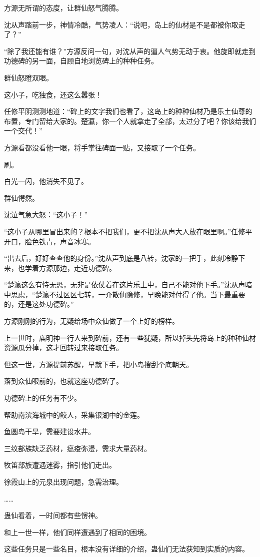 \begin{this_body}
方源无所谓的态度，让群仙怒气腾腾。

沈从声踏前一步，神情冷酷，气势凌人：“说吧，岛上的仙材是不是都被你取走了？”

“除了我还能有谁？”方源反问一句，对沈从声的逼人气势无动于衷。他旋即就走到功德碑的另一面，自顾自地浏览碑上的种种任务。

群仙怒瞪双眼。

这小子，吃独食，还这么嚣张！

任修平阴测测地道：“碑上的文字我们也看了，这岛上的种种仙材乃是乐土仙尊的布置，专门留给大家的。楚瀛，你一个人就拿走了全部，太过分了吧？你该给我们一个交代！”

方源看都没看他一眼，将手掌往碑面一贴，又接取了一个任务。

刷。

白光一闪，他消失不见了。

群仙愕然。

沈泣气急大怒：“这小子！”

“这小子从哪里冒出来的？根本不把我们，更不把沈从声大人放在眼里啊。”任修平开口，脸色铁青，声音冰寒。

“出去后，好好查查他的身份。”沈从声到底是八转，沈家的一把手，此刻冷静下来，也学着方源那边，走近功德碑。

“楚瀛这么有恃无恐，无非是依仗着在这片乐土中，自己不能对他下手。”沈从声暗中思虑，“楚瀛不过区区七转，一介散仙隐修，早晚能对付得了他。当下最重要的，还是这处功德碑。”

方源刚刚的行为，无疑给场中众仙做了一个上好的榜样。

上一世时，庙明神一行人来到碑前，还有一些犹疑，所以掉头先将岛上的种种仙材资源瓜分掉，这才回转过来接取任务。

但这一世，方源提前苏醒，早就下手，把小岛搜刮个底朝天。

落到众仙眼前的，也就这座功德碑了。

功德碑上的任务有不少。

帮助南滨海城中的鲛人，采集银湖中的金莲。

鱼圆岛干旱，需要建设水井。

三纹部族缺乏药材，瘟疫弥漫，需求大量药材。

牧笛部族遭遇迷雾，指引他们走出。

徐霞山上的元泉出现问题，急需治理。

……

蛊仙看着，一时间都有些愣神。

和上一世一样，他们同样遭遇到了相同的困境。

这些任务只是一些名目，根本没有详细的介绍，蛊仙们无法获知到实质的内容。


\end{this_body}

